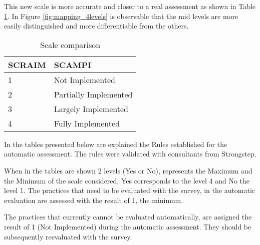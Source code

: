 This new scale is more accurate and closer to a real assessment as shown in Table \ref{tab:rules}. In Figure \ref{fig:mapping_4levels} is observable that the mid levels are more easily distinguished and more differentiable from the others.

\begin{table}[h]
	\centering
	\caption{Scale comparison}
	\begin{tabular}{|p{2cm}|p{4cm}|}
		\hline
		SCRAIM   & SCAMPI    \\
		\hline
		1 & Not Implemented\\
				\hline
				2 & Partially Implemented\\
				\hline
				3 & Largely Implemented\\
				\hline
				4 & Fully Implemented\\
				\hline
	\end{tabular}
	\label{tab:rules}
\end{table}

In the tables presented below are explained the Rules established for the automatic assessment. The rules were validated with consultants from Strongstep.

When in the tables are shown 2 levels (Yes or No), represents the Maximum and the Minimum of the scale considered, Yes corresponds to the level 4 and No the level 1.
The practices that need to be evaluated with the survey, in the automatic evaluation are assessed with the result of 1, the minimum.

The practices that currently cannot be evaluated automatically, are assigned the result of 1 (Not Implemented) during the automatic assessment. They should be subsequently reevaluated with the survey.


\newpage








